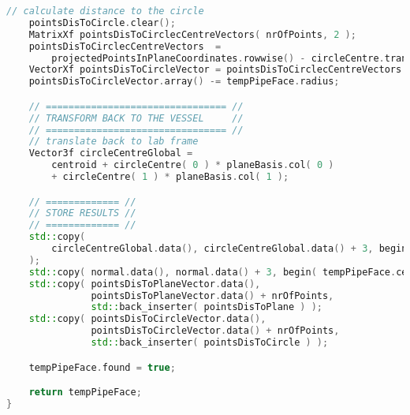 \begin{lstlisting}[language=C++, caption={Refactored pipe face finder.}, label={lst:find_circle_n_points}]
    // calculate distance to the circle
    pointsDisToCircle.clear();
    MatrixXf pointsDisToCirclecCentreVectors( nrOfPoints, 2 );
    pointsDisToCirclecCentreVectors  = 
        projectedPointsInPlaneCoordinates.rowwise() - circleCentre.transpose();
    VectorXf pointsDisToCircleVector = pointsDisToCirclecCentreVectors.rowwise().norm();
    pointsDisToCircleVector.array() -= tempPipeFace.radius;

    // ================================ //
    // TRANSFORM BACK TO THE VESSEL     //
    // ================================ //
    // translate back to lab frame
    Vector3f circleCentreGlobal =
        centroid + circleCentre( 0 ) * planeBasis.col( 0 ) 
        + circleCentre( 1 ) * planeBasis.col( 1 );

    // ============= //
    // STORE RESULTS //
    // ============= //
    std::copy( 
        circleCentreGlobal.data(), circleCentreGlobal.data() + 3, begin( tempPipeFace.centrePos ) 
    );
    std::copy( normal.data(), normal.data() + 3, begin( tempPipeFace.centreDirVec ) );
    std::copy( pointsDisToPlaneVector.data(),
               pointsDisToPlaneVector.data() + nrOfPoints,
               std::back_inserter( pointsDisToPlane ) );
    std::copy( pointsDisToCircleVector.data(),
               pointsDisToCircleVector.data() + nrOfPoints,
               std::back_inserter( pointsDisToCircle ) );

    tempPipeFace.found = true;

    return tempPipeFace;
}
\end{lstlisting}